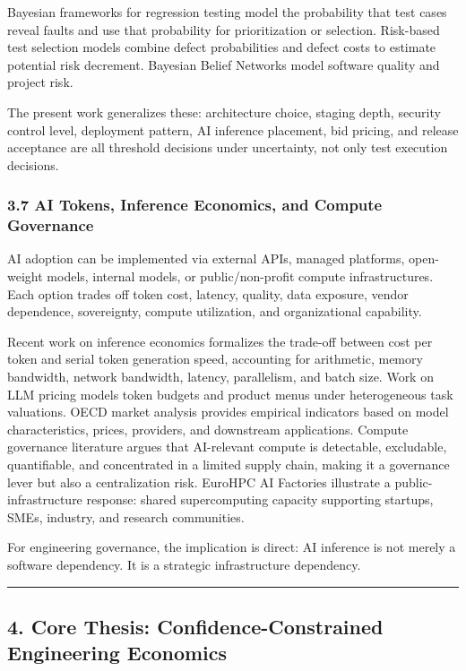 \documentclass[
]{article}
\begin{document}
Bayesian frameworks for regression testing model the probability that
test cases reveal faults and use that probability for prioritization or
selection. Risk-based test selection models combine defect probabilities
and defect costs to estimate potential risk decrement. Bayesian Belief
Networks model software quality and project risk.

The present work generalizes these: architecture choice, staging depth,
security control level, deployment pattern, AI inference placement, bid
pricing, and release acceptance are all threshold decisions under
uncertainty, not only test execution decisions.

\subsubsection{3.7 AI Tokens, Inference Economics, and Compute
Governance}\label{ai-tokens-inference-economics-and-compute-governance}

AI adoption can be implemented via external APIs, managed platforms,
open-weight models, internal models, or public/non-profit compute
infrastructures. Each option trades off token cost, latency, quality,
data exposure, vendor dependence, sovereignty, compute utilization, and
organizational capability.

Recent work on inference economics formalizes the trade-off between cost
per token and serial token generation speed, accounting for arithmetic,
memory bandwidth, network bandwidth, latency, parallelism, and batch
size. Work on LLM pricing models token budgets and product menus under
heterogeneous task valuations. OECD market analysis provides empirical
indicators based on model characteristics, prices, providers, and
downstream applications. Compute governance literature argues that
AI-relevant compute is detectable, excludable, quantifiable, and
concentrated in a limited supply chain, making it a governance lever but
also a centralization risk. EuroHPC AI Factories illustrate a
public-infrastructure response: shared supercomputing capacity
supporting startups, SMEs, industry, and research communities.

For engineering governance, the implication is direct: AI inference is
not merely a software dependency. It is a strategic infrastructure
dependency.

\begin{center}\rule{0.5\linewidth}{0.5pt}\end{center}

\subsection{4. Core Thesis: Confidence-Constrained Engineering
Economics}\label{core-thesis-confidence-constrained-engineering-economics}
\end{document}
